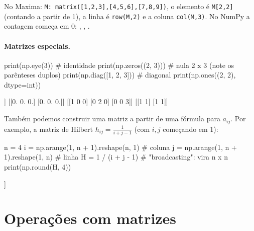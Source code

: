 \begin{maxima}
No Maxima: \texttt{M: matrix([1,2,3],[4,5,6],[7,8,9])}, o elemento é \texttt{M[2,2]} (contando a partir de 1),
a linha é \texttt{row(M,2)} e a coluna \texttt{col(M,3)}. No NumPy a contagem começa em 0: ,
, .
\end{maxima}

\paragraph{Matrizes especiais.}

\begin{entrada}
print(np.eye(3))                  # identidade
print(np.zeros((2, 3)))           # nula 2 x 3 (note os parênteses duplos)
print(np.diag([1, 2, 3]))         # diagonal
print(np.ones((2, 2), dtype=int))
\end{entrada}
\begin{saida}
[[1. 0. 0.]
 [0. 1. 0.]
 [0. 0. 1.]]
[[0. 0. 0.]
 [0. 0. 0.]]
[[1 0 0]
 [0 2 0]
 [0 0 3]]
[[1 1]
 [1 1]]
\end{saida}

Também podemos construir uma matriz a partir de uma fórmula para $a_{ij}$. Por exemplo, a matriz de Hilbert
$h_{ij}=\frac{1}{i+j-1}$ (com $i,j$ começando em 1):

\begin{entrada}
n = 4
i = np.arange(1, n + 1).reshape(n, 1)    # coluna
j = np.arange(1, n + 1).reshape(1, n)    # linha
H = 1 / (i + j - 1)                      # "broadcasting": vira n x n
print(np.round(H, 4))
\end{entrada}
\begin{saida}
[[1.     0.5    0.3333 0.25  ]
 [0.5    0.3333 0.25   0.2   ]
 [0.3333 0.25   0.2    0.1667]
 [0.25   0.2    0.1667 0.1429]]
\end{saida}

\section{Operações com matrizes}

